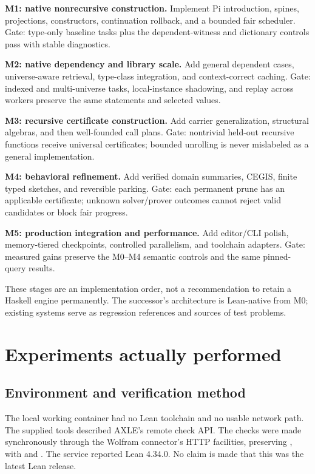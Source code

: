 \textbf{M1: native nonrecursive construction.} Implement Pi introduction, spines, projections, constructors, continuation rollback, and a bounded fair scheduler. Gate: type-only baseline tasks plus the dependent-witness and dictionary controls pass with stable diagnostics.

\textbf{M2: native dependency and library scale.} Add general dependent cases, universe-aware retrieval, type-class integration, and context-correct caching. Gate: indexed and multi-universe tasks, local-instance shadowing, and replay across workers preserve the same statements and selected values.

\textbf{M3: recursive certificate construction.} Add carrier generalization, structural algebras, and then well-founded call plans. Gate: nontrivial held-out recursive functions receive universal certificates; bounded unrolling is never mislabeled as a general implementation.

\textbf{M4: behavioral refinement.} Add verified domain summaries, CEGIS, finite typed sketches, and reversible parking. Gate: each permanent prune has an applicable certificate; unknown solver/prover outcomes cannot reject valid candidates or block fair progress.

\textbf{M5: production integration and performance.} Add editor/CLI polish, memory-tiered checkpoints, controlled parallelism, and toolchain adapters. Gate: measured gains preserve the M0--M4 semantic controls and the same pinned-query results.

These stages are an implementation order, not a recommendation to retain a Haskell engine permanently. The successor's architecture is Lean-native from M0; existing systems serve as regression references and sources of test problems.

\section{Experiments actually performed}
\label{sec:experiments}
\subsection{Environment and verification method}
The local working container had no Lean toolchain and no usable network path. The supplied tools described AXLE's remote check API. The checks were made synchronously through the Wolfram connector's HTTP facilities, preserving , with  and . The service reported Lean 4.34.0. No claim is made that this was the latest Lean release.\cite{axle}


